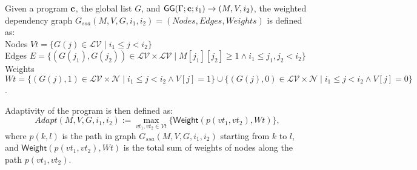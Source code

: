 \begin{defn}
Given a program ${\bf{{c}}}$, the global list $G$, and $\mathsf{GG}{(\Gamma; {\bf{{c}}}; i_1)}\to {(M, V, i_2)}$, the weighted dependency graph $G_{ssa}(M, V,G,i_1,i_2) = (Nodes, Edges, Weights)$ is defined as:
\\
Nodes $Vt = \{ G(j) \in \mathcal{LV} \mid i_1 \leq j < i_2 \}$
\\
Edges $E = \{ (G(j_1), G(j_2)) \in \mathcal{LV} \times \mathcal{LV} \mid M[j_1][j_2] \geq 1 \land  i_1 \leq j_1,j_2 < i_2   \}$
\\
 Weights $Wt = \{ (  G(j), 1 ) \in \mathcal{LV} \times \mathcal{N} \mid i_1 \leq j < i_2 \land V[j] = 1\}
        \cup \{ (  G(j), 0 ) \in \mathcal{LV} \times \mathcal{N} \mid i_1 \leq j < i_2 \land V[j] = 0 \} $.
        
Adaptivity of the program is then defined as:
\[
Adapt(M, V,G,i_1,i_2) := \max_{vt_1, vt_2 \in Vt}\{ \mathsf{Weight}( p(vt_1, vt_2), Wt) \},
\]
where $p(k, l)$ is the path in graph $G_{ssa}(M, V,G, i_1,i_2)$ starting from $k$ to $l$, and $\mathsf{Weight}(p(vt_1,vt_2), Wt)$ is the total sum of weights of nodes along the path $p(vt_1,vt_2)$.
\end{defn}        
%
%
